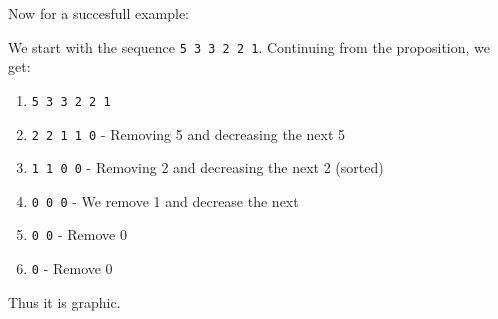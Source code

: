 Now for a succesfull example:

\begin{example}
	We start with the sequence \texttt{5 3 3 2 2 1}. Continuing from the proposition, we get:
	\begin{enumerate}
		\item \texttt{5 3 3 2 2 1}
		\item \texttt{2 2 1 1 0} - Removing 5 and decreasing the next 5
		\item \texttt{1 1 0 0} - Removing 2 and decreasing the next 2 (sorted)
		\item \texttt{0 0 0} - We remove 1 and decrease the next
		\item \texttt{0 0} - Remove 0
		\item \texttt{0} - Remove 0
	\end{enumerate}
	Thus it is graphic.
\end{example}

